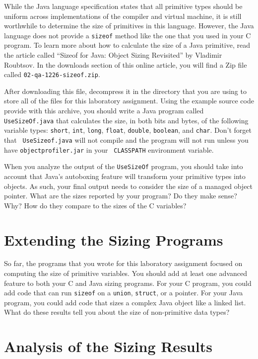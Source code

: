   While the Java language specification states that all primitive types should be uniform across implementations of the
  compiler and virtual machine, it is still worthwhile to determine the size of primitives in this language. However,
  the Java language does not provide a {\tt sizeof} method like the one that you used in your C program. To learn more
  about how to calculate the size of a Java primitive, read the article called ``Sizeof for Java: Object Sizing
  Revisited'' by Vladimir Roubtsov. In the downloads section of this online article, you will find a Zip file called
  {\tt 02-qa-1226-sizeof.zip}. 

  After downloading this file, decompress it in the directory that you are using to store all of the files for this
  laboratory assignment. Using the example source code provide with this archive, you should write a Java program called
  {\tt UseSizeOf.java} that calculates the size, in both bits and bytes, of the following variable types:  {\tt short},
  {\tt int}, {\tt long}, {\tt float}, {\tt double}, {\tt boolean}, and {\tt char}. Don't forget that {\tt
  UseSizeof.java} will not compile and the program will not run unless you have {\tt objectprofiler.jar} in your {\tt
  CLASSPATH} environment variable. 
  
  When you analyze the output of the {\tt UseSizeOf} program, you should take into account that Java's autoboxing
  feature will transform your primitive types into objects.  As such, your final output needs to consider the size of a
  managed object pointer. What are the sizes reported by your program? Do they make sense? Why? How do they compare to
  the sizes of the C variables?

\section*{Extending the Sizing Programs}

  So far, the programs that you wrote for this laboratory assignment focused on computing the size of primitive
  variables.  You should add at least one advanced feature to both your C and Java sizing programs.  For your C program,
  you could add code that can run {\tt sizeof} on a {\tt union}, {\tt struct}, or a pointer. For your Java program, you
  could add code that sizes a complex Java object like a linked list. What do these results tell you about the size of
  non-primitive data types?

\section*{Analysis of the Sizing Results}

